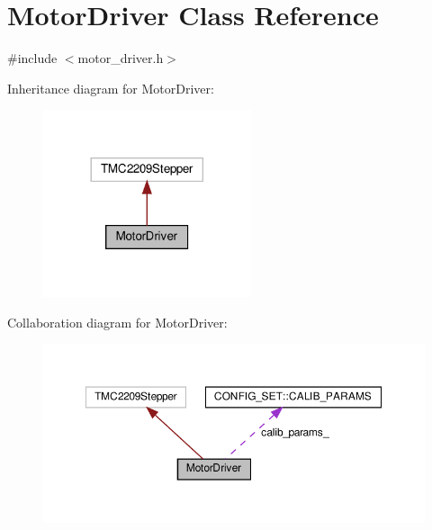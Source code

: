 \hypertarget{classMotorDriver}{}\section{Motor\+Driver Class Reference}
\label{classMotorDriver}


{\ttfamily \#include $<$motor\+\_\+driver.\+h$>$}



Inheritance diagram for Motor\+Driver\+:
\nopagebreak
\begin{figure}[H]
\begin{center}
\leavevmode
\includegraphics[width=173pt]{classMotorDriver__inherit__graph}
\end{center}
\end{figure}


Collaboration diagram for Motor\+Driver\+:
\nopagebreak
\begin{figure}[H]
\begin{center}
\leavevmode
\includegraphics[width=350pt]{classMotorDriver__coll__graph}
\end{center}
\end{figure}
